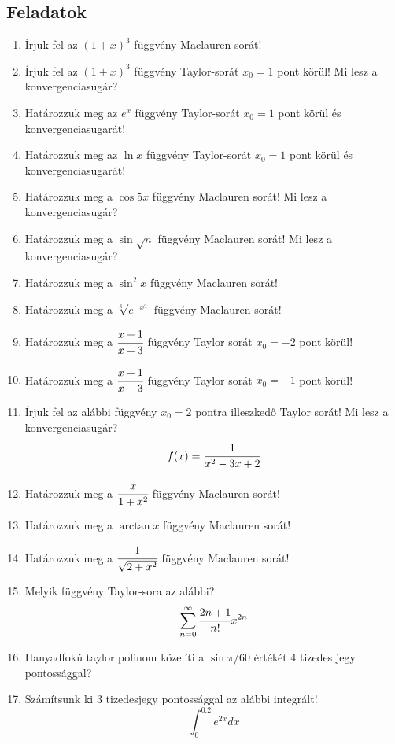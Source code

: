 \documentclass[a4paper, 12pt]{scrartcl}
\begin{document}
\subsection{Feladatok}
\begin{enumerate}
    \item Írjuk fel az $(1+x)^3$ függvény  Maclauren-sorát!
    \item Írjuk fel az $(1+x)^3$ függvény Taylor-sorát $x_0 = 1$ pont körül! Mi lesz a konvergenciasugár?
    \item Határozzuk meg az $e^x$ függvény Taylor-sorát $x_0 = 1$ pont körül és konvergenciasugarát! 
    \item Határozzuk meg az $\ln x$ függvény Taylor-sorát $x_0 = 1$ pont körül és konvergenciasugarát! 
    \item Határozzuk meg a $\cos 5x$ függvény Maclauren sorát! Mi lesz a konvergenciasugár?
    \item Határozzuk meg a $\sin \sqrt{n}$ függvény Maclauren sorát! Mi lesz a konvergenciasugár?
    \item Határozzuk meg a $\sin^2 x$ függvény Maclauren sorát!
    \item Határozzuk meg a $\sqrt[3]{e^{-x^2}}$ függvény Maclauren sorát!
    \item Határozzuk meg a $\cfrac{x+1}{x+3}$ függvény Taylor sorát $x_0 = -2$ pont körül!
    \item Határozzuk meg a $\cfrac{x+1}{x+3}$ függvény Taylor sorát $x_0 = -1$ pont körül!
    \item Írjuk fel az alábbi függvény $x_0 = 2$ pontra illeszkedő Taylor sorát! Mi lesz a konvergenciasugár?
    \[
    f(x) = \cfrac{1}{x^2-3x+2}
    \]
    \item Határozzuk meg a $\cfrac{x}{1+x^2}$ függvény Maclauren sorát!
    \item Határozzuk meg a $\arctan{x}$ függvény Maclauren sorát!
    \item Határozzuk meg a $\cfrac{1}{\sqrt{2+x^2}}$ függvény Maclauren sorát!
    \item Melyik függvény Taylor-sora az alábbi?
    \[
    \sum_{n=0}^{\infty} \cfrac{2n+1}{n!}x^{2n}
    \]
    \item Hanyadfokú taylor polinom közelíti a $\sin \pi/60$ értékét 4 tizedes jegy pontossággal?
    \item Számítsunk ki 3 tizedesjegy pontossággal az alábbi integrált!
    \[
    \int_{0}^{0.2} e^{2x}dx
    \]
\end{enumerate}
\end{document}
